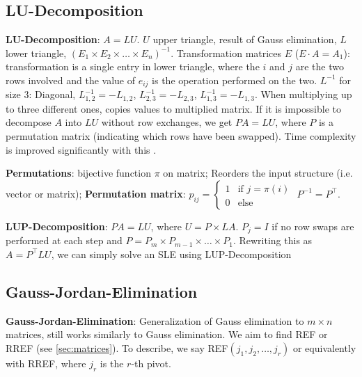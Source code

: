 \vspace{-0.5pc}
\subsection{LU-Decomposition}
\label{sec:lu-decomp}
\setcounter{all}{13}\shorttheorem \textbf{LU-Decomposition}: $A = LU$. $U$ upper triangle, result of Gauss elimination, $L$ lower triangle, $(E_1 \times E_2 \times \ldots \times E_n)^{-1}$.
Transformation matrices $E$ ($E \cdot A = A_1$): transformation is a single entry in lower triangle, where the $i$ and $j$ are the two rows involved and the value of $e_{ij}$ is the operation performed on the two. $L^{-1}$ for size $3$: Diagonal, $L^{-1}_{1,2} = -L_{1,2}$, $L^{-1}_{2,3} = -L_{2,3}$, $L^{-1}_{1,3} = -L_{1,3}$.
When multiplying up to three different ones, copies values to multiplied matrix.
If it is impossible to decompose $A$ into $LU$ without row exchanges, we get $PA = LU$, where $P$ is a permutation matrix (indicating which rows have been swapped). Time complexity is improved significantly with this .

\shortdef \textbf{Permutations}: bijective function $\pi$ on matrix; Reorders the input structure (i.e. vector or matrix); 
\shortdef \textbf{Permutation matrix}: $p_{ij} = \begin{cases}
    1 & \text{if } j = \pi(i)\\
    0 & \text{else}
\end{cases}$
\shortlemma $P^{-1} = P^{\top}$. 

\setcounter{all}{18}\shorttheorem \textbf{LUP-Decomposition}: $PA = LU$, where $U = P\times L A$. $P_j = I$ if no row swaps are performed at each step and $P = P_m \times P_{m - 1} \times \ldots \times P_1$. Rewriting this as $A = P^{\top}LU$, we can simply solve an SLE using LUP-Decomposition

\vspace{-0.5pc}
\subsection{Gauss-Jordan-Elimination}
\label{sec:gauss-jordan}
\textbf{Gauss-Jordan-Elimination}: Generalization of Gauss elimination to $m \times n$ matrices, still works similarly to Gauss elimination. We aim to find REF or RREF (see \ref{sec:matrices}). To describe, we say REF$(j_1, j_2, \ldots, j_r)$ or equivalently with RREF, where $j_r$ is the $r$-th pivot.

